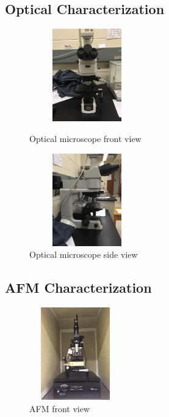 \subsection{Optical Characterization}\label{subsec:characterization_optical}
\begin{figure}[ht]
	\centering
	\begin{minipage}[b]{0.45\linewidth}
		\centering
		\includegraphics[height=4cm,width=5cm]{figs/experimental/optical_microscope_front_view}
		\caption[Optical microscope front view]{Optical microscope front view}
		\label{fig:optical_microscope_front_view2}
	\end{minipage}
	\qquad
	\begin{minipage}[b]{0.45\linewidth}
		\centering
		\includegraphics[height=4cm,width=5cm]{figs/experimental/optical_microscope_side_view}
		\caption[Optical microscope side view]{Optical microscope side view}
		\label{fig:optical_microscope_side_view}
	\end{minipage}
\end{figure}

\subsection{AFM Characterization}\label{subsec:characterization_afm}
\begin{figure}[ht]
	\centering
	\includegraphics[height=4cm,width=4cm]{figs/experimental/AFM_front_view}
	\caption[AFM front view]{AFM front view}
	\label{fig:afm_front_view}
\end{figure}

